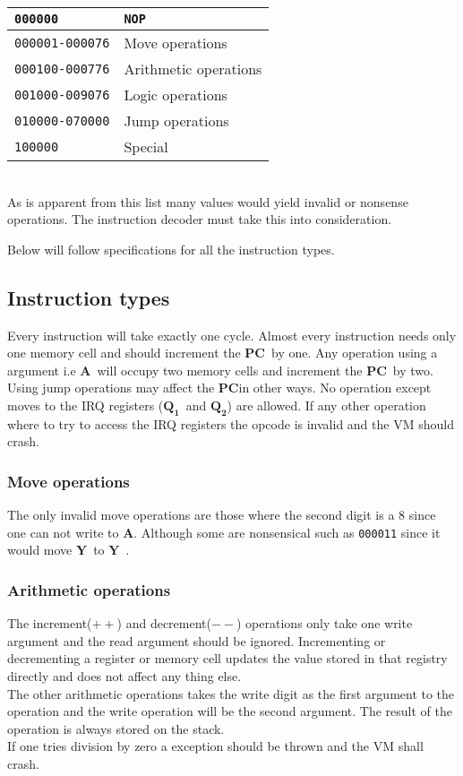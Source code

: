 \documentclass{article}
\newcommand{\y}{$\textbf{Y}$}
\newcommand{\A}{$\textbf{A}$}
\newcommand{\q}{$\textbf{Q}_{\textbf{1}}$}
\newcommand{\qq}{$\textbf{Q}_{\textbf{2}}$}
\newcommand{\pc}{$\textbf{PC}$}
\newcommand{\V}{\verb}
\begin{document}
\begin{tabular}{l l}
  \V+000000+ & \V+NOP+ \\
  \hline
  \V+000001-000076+ & Move operations \\
  \hline
  \V+000100-000776+ & Arithmetic operations \\
  \hline
  \V+001000-009076+ & Logic operations \\
  \hline
  \V+010000-070000+ & Jump operations \\
  \hline
  \V+100000+ & Special \\
\end{tabular} \\
As is apparent from this list many values would yield invalid or
nonsense operations.
The instruction decoder must take this into consideration.

Below will follow specifications for all the instruction types.

\subsection{Instruction types}
Every instruction will take exactly one cycle. Almost every instruction needs
only one memory cell and should increment the \pc \  by one.
Any operation using  a argument i.e \A \ will occupy two memory cells and
increment the \pc \ by two.\\
Using jump operations may affect the \pc in other ways.
No operation except moves to the IRQ registers (\q \ and \qq ) are allowed.
If any other operation where to try to access the IRQ registers the opcode is
invalid and the VM should crash.

\subsubsection{Move operations}
The only invalid move operations are those where the second digit is a 8 since
one can not write to \A.
Although some are nonsensical such as \V+000011+ since it would move \y \ to \y \ .

\subsubsection{Arithmetic operations}
The increment($++$) and decrement($--$) operations only take one write argument
and the read argument should be ignored. Incrementing or decrementing a register
or memory cell updates the value stored in that registry directly and does not
affect any thing else.\\
The other arithmetic operations takes the write digit as the first argument to
the operation and the write operation will be the second argument.
The result of the operation is always stored on the stack.\\
If one tries division by zero a exception should be thrown and the VM shall
crash.
\end{document}
